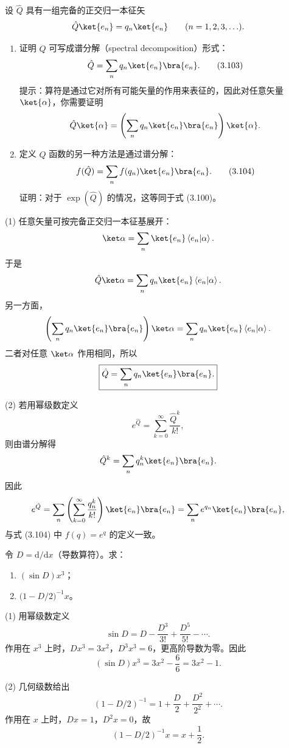 \begin{question}
设 $\hat Q$ 具有一组完备的正交归一本征矢
\[
\hat Q\ket{e_n}=q_n\ket{e_n}\qquad(n=1,2,3,\ldots).
\]
\begin{enumerate}
\item 证明 $\hat Q$ 可写成谱分解（spectral decomposition）形式：
\[
\hat Q=\sum_n q_n\ket{e_n}\bra{e_n}.\tag{3.103}
\]
提示：算符是通过它对所有可能矢量的作用来表征的，因此对任意矢量 $\ket{\alpha}$，你需要证明
\[
\hat Q\ket{\alpha}=\left(\sum_n q_n\ket{e_n}\bra{e_n}\right)\ket{\alpha}.
\]
\item 定义 $\hat Q$ 函数的另一种方法是通过谱分解：
\[
f(\hat Q)=\sum_n f(q_n)\ket{e_n}\bra{e_n}.\tag{3.104}
\]
证明：对于 $\exp(\hat Q)$ 的情况，这等同于式 (3.100)。
\end{enumerate}

\par\smallskip
{}

\end{question}
\begin{solution}
(1) 任意矢量可按完备正交归一本征基展开：
\[
\ket\alpha=\sum_n \ket{e_n}\left\langle e_n|\alpha \right\rangle.
\]
于是
\[
\hat Q\ket\alpha=\sum_n q_n\ket{e_n}\left\langle e_n|\alpha \right\rangle.
\]
另一方面，
\[
\left(\sum_n q_n\ket{e_n}\bra{e_n}\right)\ket\alpha
=\sum_n q_n\ket{e_n}\left\langle e_n|\alpha \right\rangle.
\]
二者对任意 $\ket\alpha$ 作用相同，所以
\[
\boxed{\hat Q=\sum_n q_n\ket{e_n}\bra{e_n}.}
\]

(2) 若用幂级数定义
\[
e^{\hat Q}=\sum_{k=0}^{\infty}\frac{\hat Q^k}{k!},
\]
则由谱分解得
\[
\hat Q^k=\sum_n q_n^k\ket{e_n}\bra{e_n}.
\]
因此
\[
e^{\hat Q}=\sum_n\left(\sum_{k=0}^{\infty}\frac{q_n^k}{k!}\right)
\ket{e_n}\bra{e_n}
=\sum_n e^{q_n}\ket{e_n}\bra{e_n},
\]
与式 (3.104) 中 $f(q)=e^q$ 的定义一致。
\end{solution}

\begin{question}
令 $D=\mathrm d/\mathrm dx$（导数算符）。求：
\begin{enumerate}
\item $(\sin D)x^3$；
\item $\bigl(1-D/2\bigr)^{-1}x$。
\end{enumerate}
\end{question}
\begin{solution}
(1) 用幂级数定义
\[
\sin D=D-\frac{D^3}{3!}+\frac{D^5}{5!}-\cdots.
\]
作用在 $x^3$ 上时，$D x^3=3x^2$，$D^3x^3=6$，更高阶导数为零。因此
\[
(\sin D)x^3=3x^2-\frac{6}{6}=\boxed{3x^2-1}.
\]

(2) 几何级数给出
\[
(1-D/2)^{-1}=1+\frac D2+\frac{D^2}{2^2}+\cdots.
\]
作用在 $x$ 上时，$Dx=1$，$D^2x=0$，故
\[
(1-D/2)^{-1}x=x+\frac12.
\]
\end{solution}

